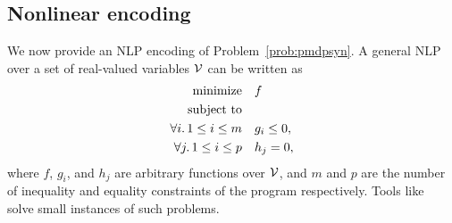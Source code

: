 \subsection{Nonlinear encoding}
We now provide an NLP encoding of Problem~\ref{prob:pmdpsyn}. A general NLP over %
a set of real-valued variables $\mathcal{V}$ can be written as
\begin{align}
	\text{minimize} 		&\quad f\label{eq:nl_obj} \\
	\text{subject to} 		&\notag\\
	\forall i.\, 1\leq i\leq m 	&\quad g_i \leq 0,\label{eq:nl_ineq}\\
	\forall j.\, 1\leq i\leq p 	&\quad h_j = 0,\label{eq:nl_eq}
\end{align}
where $f$, $g_i$, and $h_j$ are arbitrary functions over $\mathcal{V}$, and $m$ and $p$ are the 
number of inequality and equality constraints of the program respectively. Tools like
~\cite{ipopt} solve small instances of such problems.



